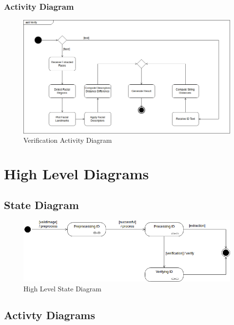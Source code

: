 \documentclass{article}
\begin{document}
\subsubsection{Activity Diagram}
	\begin{figure}[H]
	    \centering
	    \includegraphics[scale=0.5]{img/verify_activity.png}
	    \caption{Verification Activity Diagram}
	 \end{figure}
	 \pagebreak
\section{High Level Diagrams}

\subsection{State Diagram}
\begin{figure}[h]
	\centering
	\includegraphics[scale=0.5]{img/StateModelHighLevel.png}
	\caption{High Level State Diagram}
\end{figure}

\subsection{Activty Diagrams}
\end{document}
